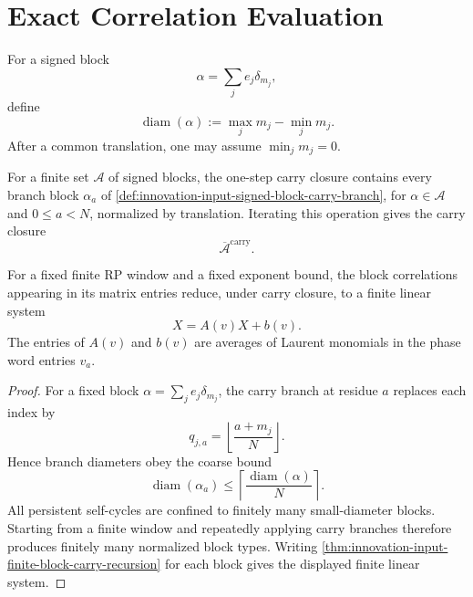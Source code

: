 \section{Exact Correlation Evaluation}
\label{sec:innovation-input-exact-correlation-evaluation}

\begin{definition}
\label{def:innovation-input-block-diameter}
For a signed block
$$
\alpha=\sum_j e_j\delta_{m_j},
$$
define
$$
\operatorname{diam}(\alpha):=
\max_j m_j-\min_j m_j.
$$
After a common translation, one may assume $\min_j m_j=0$.
\end{definition}

\begin{definition}
\label{def:innovation-input-carry-closure}
For a finite set $\mathcal A$ of signed blocks, the one-step carry closure
contains every branch block $\alpha_a$ of
\autoref{def:innovation-input-signed-block-carry-branch}, for
$\alpha\in\mathcal A$ and $0\le a<N$, normalized by translation. Iterating
this operation gives the carry closure
$$
\overline{\mathcal A}^{\mathrm{carry}}.
$$
\end{definition}

\begin{proposition}
\label{prop:innovation-input-finite-window-correlation-linear-system}
For a fixed finite RP window and a fixed exponent bound, the block
correlations appearing in its matrix entries reduce, under carry closure,
to a finite linear system
$$
X=A(v)X+b(v).
$$
The entries of $A(v)$ and $b(v)$ are averages of Laurent monomials in the
phase word entries $v_a$.
\end{proposition}

\begin{proof}
For a fixed block $\alpha=\sum_j e_j\delta_{m_j}$, the carry branch at
residue $a$ replaces each index by
$$
q_{j,a}=\left\lfloor\frac{a+m_j}{N}\right\rfloor.
$$
Hence branch diameters obey the coarse bound
$$
\operatorname{diam}(\alpha_a)
\le
\left\lceil\frac{\operatorname{diam}(\alpha)}{N}\right\rceil.
$$
All persistent self-cycles are confined to finitely many small-diameter
blocks. Starting from a finite window and repeatedly applying carry
branches therefore produces finitely many normalized block types. Writing
\autoref{thm:innovation-input-finite-block-carry-recursion} for each block
gives the displayed finite linear system.
\end{proof}

